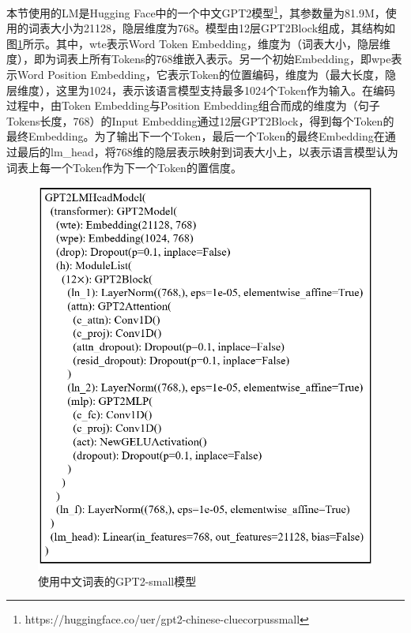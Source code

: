 
本节使用的LM是Hugging Face中的一个中文GPT2模型\footnote{https://huggingface.co/uer/gpt2-chinese-cluecorpussmall}，其参数量为81.9M，使用的词表大小为21128，隐层维度为768。模型由12层GPT2Block组成，其结构如图\ref{GPT2-small}所示。其中，wte表示Word Token Embedding，维度为（词表大小，隐层维度），即为词表上所有Tokens的768维嵌入表示。另一个初始Embedding，即wpe表示Word Position Embedding，它表示Token的位置编码，维度为（最大长度，隐层维度），这里为1024，表示该语言模型支持最多1024个Token作为输入。在编码过程中，由Token Embedding与Position Embedding组合而成的维度为（句子Tokens长度，768）的Input Embedding通过12层GPT2Block，得到每个Token的最终Embedding。为了输出下一个Token，最后一个Token的最终Embedding在通过最后的lm\_head，将768维的隐层表示映射到词表大小上，以表示语言模型认为词表上每一个Token作为下一个Token的置信度。

\begin{figure}[h]
	\centering
	\includegraphics[width=0.7\linewidth]{figures/GPT2_Structure.png}
	\caption{使用中文词表的GPT2-small模型}
	\label{GPT2-small}
\end{figure}

